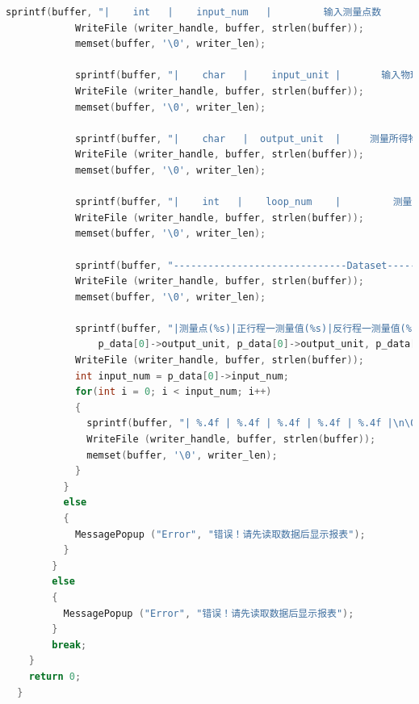 \documentclass[a4paper,12pt,twoside]{article}%
\begin{document}
\begin{lstlisting}[language=C]
            sprintf(buffer, "|    int   |    input_num   |         输入测量点数      |    %d    |\n\0", p_data[0]->input_num);
            WriteFile (writer_handle, buffer, strlen(buffer));
            memset(buffer, '\0', writer_len);
            
            sprintf(buffer, "|    char   |    input_unit |       输入物理量的单位     |    %s    |\n\0", p_data[0]->input_unit);
            WriteFile (writer_handle, buffer, strlen(buffer));
            memset(buffer, '\0', writer_len);
            
            sprintf(buffer, "|    char   |  output_unit  |     测量所得物理量的单位    |    %s    |\n\0", p_data[0]->output_unit);
            WriteFile (writer_handle, buffer, strlen(buffer));
            memset(buffer, '\0', writer_len);
            
            sprintf(buffer, "|    int   |    loop_num    |         测量的循环数       |    %d    |\n\0", p_data[0]->loop_num);
            WriteFile (writer_handle, buffer, strlen(buffer));
            memset(buffer, '\0', writer_len);
            
            sprintf(buffer, "------------------------------Dataset------------------------------\n\0");
            WriteFile (writer_handle, buffer, strlen(buffer));
            memset(buffer, '\0', writer_len);
            
            sprintf(buffer, "|测量点(%s)|正行程一测量值(%s)|反行程一测量值(%s)|正行程二测量值(%s)|反行程二测量值(%s)|\n\0", p_data[0]->input_unit, 
                p_data[0]->output_unit, p_data[0]->output_unit, p_data[0]->output_unit, p_data[0]->output_unit);
            WriteFile (writer_handle, buffer, strlen(buffer));
            int input_num = p_data[0]->input_num;
            for(int i = 0; i < input_num; i++)
            {
              sprintf(buffer, "| %.4f | %.4f | %.4f | %.4f | %.4f |\n\0", p_data[0]->input[i], p_data[0]->output[i], p_data[0]->output[i + input_num * 1], p_data[0]->output[i + input_num * 2], p_data[0]->output[i + input_num * 3]);
              WriteFile (writer_handle, buffer, strlen(buffer));
              memset(buffer, '\0', writer_len);
            }
          }
          else
          {
            MessagePopup ("Error", "错误！请先读取数据后显示报表");
          }
        }
        else
        {
          MessagePopup ("Error", "错误！请先读取数据后显示报表");
        }
        break;
    }
    return 0;
  }
  

\end{lstlisting}
\end{document}
